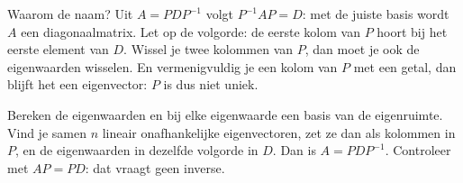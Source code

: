 Waarom de naam? Uit $A = PDP^{-1}$ volgt $P^{-1}AP = D$: met de juiste basis wordt $A$ een diagonaalmatrix. Let op de volgorde: de eerste kolom van $P$ hoort bij het eerste element van $D$. Wissel je twee kolommen van $P$, dan moet je ook de eigenwaarden wisselen. En vermenigvuldig je een kolom van $P$ met een getal, dan blijft het een eigenvector: $P$ is dus niet uniek.


\begin{werkwijze}
Bereken de eigenwaarden en bij elke eigenwaarde een basis van de eigenruimte. Vind je samen $n$ lineair onafhankelijke eigenvectoren, zet ze dan als kolommen in $P$, en de eigenwaarden in dezelfde volgorde in $D$. Dan is $A = PDP^{-1}$. Controleer met $AP = PD$: dat vraagt geen inverse.
\end{werkwijze}


\begin{oefeningen}
\end{oefeningen}

